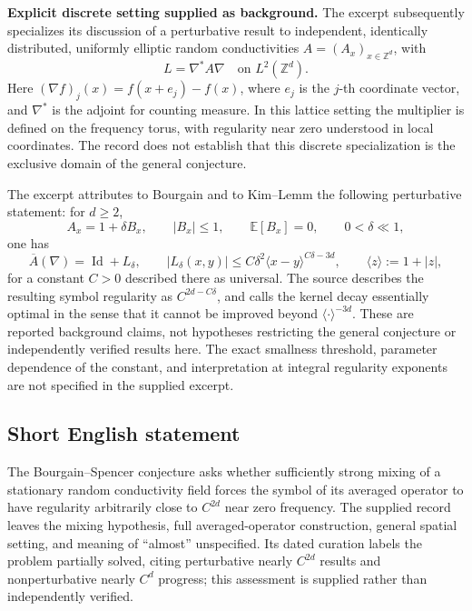 \documentclass[11pt]{article}
\newcommand{\Z}{\mathbb{Z}}
\newcommand{\E}{\mathbb{E}}
\begin{document}
\textbf{Explicit discrete setting supplied as background.} The excerpt subsequently specializes its discussion of a perturbative result to independent, identically distributed, uniformly elliptic random conductivities \(A=(A_x)_{x\in\Z^d}\), with
\[
L=\nabla^*A\nabla\quad\text{on }L^2(\Z^d).
\]
Here \((\nabla f)_j(x)=f(x+e_j)-f(x)\), where \(e_j\) is the \(j\)-th coordinate vector, and \(\nabla^*\) is the adjoint for counting measure. In this lattice setting the multiplier is defined on the frequency torus, with regularity near zero understood in local coordinates. The record does not establish that this discrete specialization is the exclusive domain of the general conjecture.

The excerpt attributes to Bourgain and to Kim--Lemm the following perturbative statement: for \(d\geq2\),
\[
A_x=1+\delta B_x,\qquad
|B_x|\leq1,\qquad \E[B_x]=0,\qquad 0<\delta\ll1,
\]
one has
\[
\overline A(\nabla)=\operatorname{Id}+L_\delta,
\qquad
|L_\delta(x,y)|
 \leq C\delta^2\langle x-y\rangle^{C\delta-3d},
\qquad \langle z\rangle:=1+|z|,
\]
for a constant \(C>0\) described there as universal. The source describes the resulting symbol regularity as \(C^{2d-C\delta}\), and calls the kernel decay essentially optimal in the sense that it cannot be improved beyond \(\langle\cdot\rangle^{-3d}\). These are reported background claims, not hypotheses restricting the general conjecture or independently verified results here. The exact smallness threshold, parameter dependence of the constant, and interpretation at integral regularity exponents are not specified in the supplied excerpt.
\subsection{Short English statement}
The Bourgain--Spencer conjecture asks whether sufficiently strong mixing of a stationary random conductivity field forces the symbol of its averaged operator to have regularity arbitrarily close to \(C^{2d}\) near zero frequency. The supplied record leaves the mixing hypothesis, full averaged-operator construction, general spatial setting, and meaning of ``almost'' unspecified. Its dated curation labels the problem partially solved, citing perturbative nearly \(C^{2d}\) results and nonperturbative nearly \(C^d\) progress; this assessment is supplied rather than independently verified.
\end{document}
